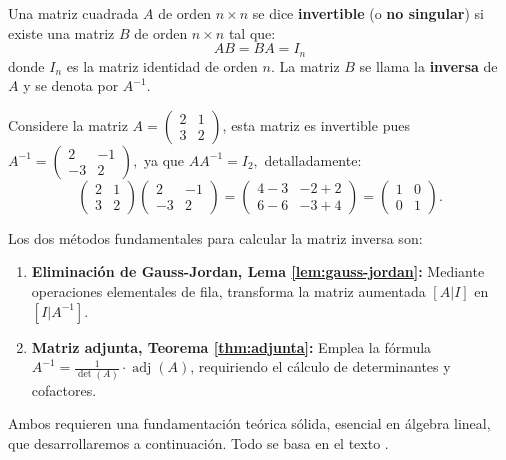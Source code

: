 \begin{definition}
Una matriz cuadrada $A$ de orden $n \times n$ se dice \textbf{invertible} (o \textbf{no singular}) si existe una matriz $B$ de orden $n \times n$ tal que:
$$AB = BA = I_n$$
donde $I_n$ es la matriz identidad de orden $n$. La matriz $B$ se llama la \textbf{inversa} de $A$ y se denota por $A^{-1}$.
\end{definition}

\begin{example}
Considere la matriz $A = \begin{pmatrix} 2 & 1 \\ 3 & 2 \end{pmatrix}$, esta matriz es invertible pues $A^{-1}= \begin{pmatrix} 2 & -1 \\ -3 & 2 \end{pmatrix},$ ya que $AA^{-1} = I_2,$ detalladamente:
$$\begin{pmatrix} 2 & 1 \\ 3 & 2 \end{pmatrix} \begin{pmatrix} 2 & -1 \\ -3 & 2 \end{pmatrix} = \begin{pmatrix} 4-3 & -2+2 \\ 6-6 & -3+4 \end{pmatrix} = \begin{pmatrix} 1 & 0 \\ 0 & 1 \end{pmatrix}.$$
\end{example}

\begin{theorem}
Los dos métodos fundamentales para calcular la matriz inversa son:
\begin{enumerate}
\item \textbf{Eliminación de Gauss-Jordan, Lema \ref{lem:gauss-jordan}:} Mediante operaciones elementales de fila, transforma la matriz aumentada $[A|I]$ en $[I|A^{-1}]$. 
\item \textbf{Matriz adjunta, Teorema \ref{thm:adjunta}:} Emplea la fórmula $A^{-1} = \frac{1}{\det(A)} \cdot \operatorname{adj}(A)$, requiriendo el cálculo de determinantes y cofactores.
\end{enumerate}
Ambos requieren una fundamentación teórica sólida, esencial en álgebra lineal, que desarrollaremos a continuación. Todo se basa en el texto \cite{araujo2014algebra}.
\end{theorem}
